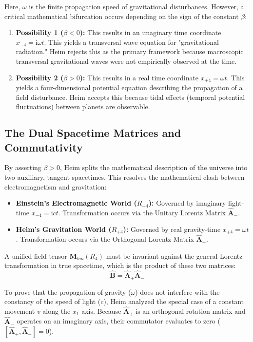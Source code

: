 \documentclass[11pt,a4paper,oneside]{article}
\newcommand{\iu}{\mathrm{i}}              %
\begin{document}
Here, $\omega$ is the finite propagation speed of gravitational disturbances. However, a critical mathematical bifurcation occurs depending on the sign of the constant $\beta$:

\begin{enumerate}
    \item \textbf{Possibility 1 ($\beta < 0$):} This results in an imaginary time coordinate $x_{-4} = \iu \omega t$. This yields a transversal wave equation for "gravitational radiation." Heim rejects this as the primary framework because macroscopic transversal gravitational waves were not empirically observed at the time.
    \item \textbf{Possibility 2 ($\beta > 0$):} This results in a real time coordinate $x_{+4} = \omega t$. This yields a four-dimensional potential equation describing the propagation of a field disturbance. Heim accepts this because tidal effects (temporal potential fluctuations) between planets are observable.
\end{enumerate}

\subsection{The Dual Spacetime Matrices and Commutativity}

By asserting $\beta > 0$, Heim splits the mathematical description of the universe into two auxiliary, tangent spacetimes. This resolves the mathematical clash between electromagnetism and gravitation:

\begin{itemize}
    \item \textbf{Einstein's Electromagnetic World ($R_{-4}$):} Governed by imaginary light-time $x_{-4} = \iu c t$. Transformation occurs via the Unitary Lorentz Matrix $\hat{\mathbf{A}}_-$.
    \item \textbf{Heim's Gravitation World ($R_{+4}$):} Governed by real gravity-time $x_{+4} = \omega t$. Transformation occurs via the Orthogonal Lorentz Matrix $\hat{\mathbf{A}}_+$.
\end{itemize}

A unified field tensor $\mathbf{M}_{km}(R_4)$ must be invariant against the general Lorentz transformation in true spacetime, which is the product of these two matrices:
\begin{equation}
    \hat{\mathbf{B}} = \hat{\mathbf{A}}_+ \hat{\mathbf{A}}_-
\end{equation}

To prove that the propagation of gravity ($\omega$) does not interfere with the constancy of the speed of light ($c$), Heim analyzed the special case of a constant movement $v$ along the $x_1$ axis. Because $\hat{\mathbf{A}}_+$ is an orthogonal rotation matrix and $\hat{\mathbf{A}}_-$ operates on an imaginary axis, their commutator evaluates to zero ($[\hat{\mathbf{A}}_+, \hat{\mathbf{A}}_-] = 0$). 
\end{document}
